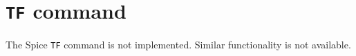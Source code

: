 %
%
%
%
\section{{\tt TF} command}
The Spice {\tt TF} command is not implemented.  Similar functionality is
not available.
